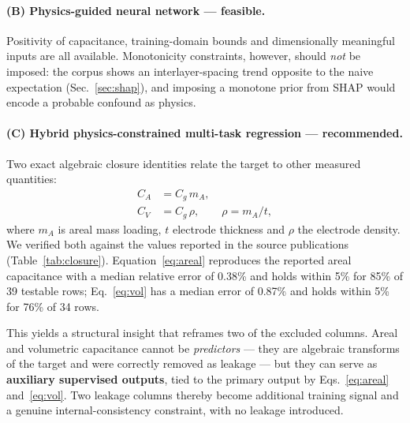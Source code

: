 \paragraph{(B) Physics-guided neural network --- feasible.}
Positivity of capacitance, training-domain bounds and dimensionally meaningful inputs are all
available. Monotonicity constraints, however, should \emph{not} be imposed: the corpus shows
an interlayer-spacing trend opposite to the naive expectation (Sec.~\ref{sec:shap}), and
imposing a monotone prior from SHAP would encode a probable confound as physics.

\paragraph{(C) Hybrid physics-constrained multi-task regression --- recommended.}
Two exact algebraic closure identities relate the target to other measured quantities:
\begin{align}
C_A &= C_g\, m_A, \label{eq:areal}\\
C_V &= C_g\, \rho, \qquad \rho = m_A / t, \label{eq:vol}
\end{align}
where $m_A$ is areal mass loading, $t$ electrode thickness and $\rho$ the electrode density.
We verified both against the values reported in the source publications
(Table~\ref{tab:closure}). Equation~\eqref{eq:areal} reproduces the reported areal
capacitance with a median relative error of 0.38\% and holds within
5\% for 85\% of 39 testable rows;
Eq.~\eqref{eq:vol} has a median error of 0.87\% and holds within
5\% for 76\% of 34 rows.

This yields a structural insight that reframes two of the excluded columns. Areal and
volumetric capacitance cannot be \emph{predictors} --- they are algebraic transforms of the
target and were correctly removed as leakage --- but they can serve as \textbf{auxiliary
supervised outputs}, tied to the primary output by Eqs.~\eqref{eq:areal}
and~\eqref{eq:vol}. Two leakage columns thereby become additional training signal and a
genuine internal-consistency constraint, with no leakage introduced.

